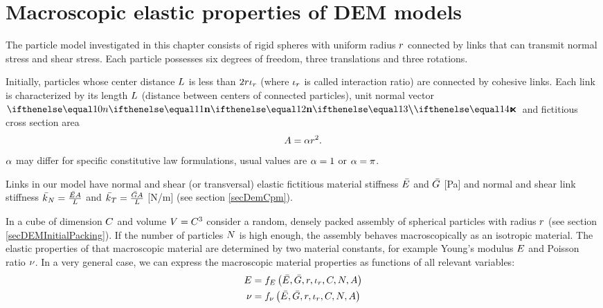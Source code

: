 \chapter{Macroscopic elastic properties of DEM models}\label{chapMacroproperties}

The particle model investigated in this chapter consists of rigid spheres with uniform radius $r$ connected by links that can transmit normal stress and shear stress.
Each particle possesses six degrees of freedom, three translations and three rotations.

Initially, particles whose center distance $L$ is less than $2r\iota_r$ (where $\iota_r$ is called interaction ratio) are connected by cohesive links.
Each link is characterized by its
length $L$ (distance between centers of connected particles),
unit normal vector $\normalVector$
and
fictitious cross section area
\begin{equation}
	A = \alpha r^2
	.
	\label{eqMacroPropertiesElasticLinkCSArea}
\end{equation}
$\alpha$ may differ for specific constitutive law formulations, usual values are $\alpha=1$ or $\alpha=\pi$.

Links in our model have normal and shear (or transversal) elastic fictitious material
stiffness
$\linkMaterialStiffnessNormal$
and
$\linkMaterialStiffnessShear$
[Pa] and normal and shear link stiffness
$\linkStiffnessNormal = \frac{\linkMaterialStiffnessNormal\linkCrossSectionArea}{\linkLength}$
and
$\linkStiffnessShear = \frac{\linkMaterialStiffnessShear\linkCrossSectionArea}{\linkLength}$
[N/m] (see section \ref{secDemCpm}).

In a cube of dimension $C$ and volume $V=C^3$ consider a random, densely packed assembly of spherical particles with radius $r$ (see section \ref{secDEMInitialPacking}).
If the number of particles $N$ is high enough, the assembly behaves macroscopically as an isotropic material.
The elastic properties of that macroscopic material are determined by two material constants, for example Young's modulus $E$ and Poisson ratio $\nu$.
In a very general case, we can express the macroscopic material properties as functions of all relevant variables:
\begin{align}
	\youngModulus &= f_\youngModulus \left(
		\linkMaterialStiffnessNormal,
		\linkMaterialStiffnessShear,
		\radius,
		\interactionRatio,
		\cubeDimension,
		\numberOfParticles,
		\linkCrossSectionArea
	\right)
	\label{eqMacroPropertiesElasticGeneralYoung}
	\\
	\poissonRatio &= f_\poissonRatio \left(
		\linkMaterialStiffnessNormal,
		\linkMaterialStiffnessShear,
		\radius,
		\interactionRatio,
		\cubeDimension,
		\numberOfParticles,
		\linkCrossSectionArea
	\right)
	\label{eqMacroPropertiesElasticGeneralPoisson}
\end{align}

